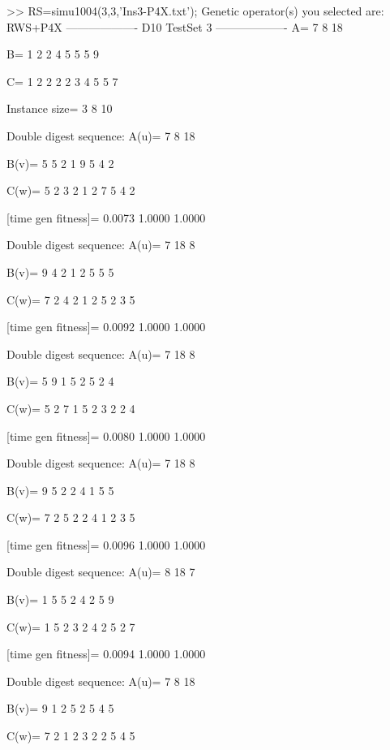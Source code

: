 >> RS=simu1004(3,3,'Ins3-P4X.txt');
Genetic operator(s) you selected are:
RWS+P4X
------------------- D10 TestSet 3 -------------------
A=
     7     8    18

B=
     1     2     2     4     5     5     5     9

C=
     1     2     2     2     2     3     4     5     5     7

Instance size=
     3     8    10

Double digest sequence:
A(u)=
     7     8    18

B(v)=
     5     5     2     1     9     5     4     2

C(w)=
     5     2     3     2     1     2     7     5     4     2

[time gen fitness]=
    0.0073    1.0000    1.0000

Double digest sequence:
A(u)=
     7    18     8

B(v)=
     9     4     2     1     2     5     5     5

C(w)=
     7     2     4     2     1     2     5     2     3     5

[time gen fitness]=
    0.0092    1.0000    1.0000

Double digest sequence:
A(u)=
     7    18     8

B(v)=
     5     9     1     5     2     5     2     4

C(w)=
     5     2     7     1     5     2     3     2     2     4

[time gen fitness]=
    0.0080    1.0000    1.0000

Double digest sequence:
A(u)=
     7    18     8

B(v)=
     9     5     2     2     4     1     5     5

C(w)=
     7     2     5     2     2     4     1     2     3     5

[time gen fitness]=
    0.0096    1.0000    1.0000

Double digest sequence:
A(u)=
     8    18     7

B(v)=
     1     5     5     2     4     2     5     9

C(w)=
     1     5     2     3     2     4     2     5     2     7

[time gen fitness]=
    0.0094    1.0000    1.0000

Double digest sequence:
A(u)=
     7     8    18

B(v)=
     9     1     2     5     2     5     4     5

C(w)=
     7     2     1     2     3     2     2     5     4     5

